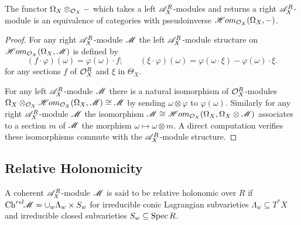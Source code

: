 \begin{lemma}
  The functor $\Omega_X\otimes_{\mathcal{O}_X}{-}$ which takes a left $\mathscr{A}_X^R$-modules and returns a right $\mathscr{A}_X^R$-module is an equivalence of categories with pseudoinverse  $\mathscr{H}om_{\mathcal{O}_X}(\Omega_X,{-})$.
\end{lemma}
\begin{proof}
  For any right $\mathscr{A}_X^R$-module $\mathscr{M}$ the left $\mathscr{A}_X^R$-module structure on $\mathscr{H}om_{\mathcal{O}_X}(\Omega_X, \mathscr{M})$ is defined by
  $$(f \cdot \varphi)(\omega)= \varphi(\omega)\cdot f; \qquad (\xi\cdot \varphi)(\omega) = \varphi(\omega \cdot \xi) - \varphi(\omega)\cdot \xi. $$
  for any sections $f$ of $\mathcal{O}_X^R$ and $\xi$ in $\Theta_X$.

  For any left $\mathscr{A}_X^R$-module $\mathscr{M}$ there is a natural isomorphism of $\mathcal{O}_X^R$-modules $\Omega_X\otimes_{\mathcal{O}_X}\mathscr{H} om _{\mathcal{O}_X}(\Omega_X, \mathscr{M}) \cong \mathscr{M}$ by sending $\omega \otimes \varphi$ to $\varphi(\omega)$.
  Similarly for any right $\mathscr{A}_X^R$-module $\mathscr{M}$ the isomorphism $\mathscr{M} \cong \mathscr{H} om_{\mathcal{O}_X}(\Omega_X, \Omega_X\otimes \mathscr{M})$ associates to a section $m$ of $\mathscr{M}$ the morphism $\omega \mapsto \omega \otimes m$.
  A direct computation verifies these isomorphisms commute with the $\mathscr{A}_X^R$-module structure.
\end{proof}

\subsection{Relative Holonomicity}
A coherent $\mathscr{A}_X^R$-module $\mathscr{M}$ is said to be relative holonomic over $R$ if $\operatorname{Ch}^{rel}\mkern-5mu \mathscr{M} = \cup_w \Lambda_w \times S_w$
for irreducible conic Lagrangian subvarieties $\Lambda_w\subseteq T^*X$ and irreducible closed subvarieties $S_w\subseteq \operatorname{Spec} R$.

